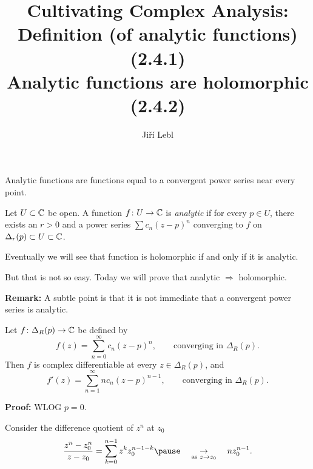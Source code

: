 \documentclass[10pt,aspectratio=169]{beamer}
\author{Ji\v{r}\'i Lebl}
\institute[OSU]{%
Departemento pri Matematiko de Oklahoma {\^S}tata Universitato}
\title{Cultivating Complex Analysis:\\%
Definition (of analytic functions) (2.4.1)\\%
Analytic functions are holomorphic (2.4.2)}
\date{}
\begin{document}
\begin{frame}
\titlepage
\end{frame}


\begin{frame}

Analytic functions are functions equal to
a convergent power series near every point.

\begin{definition}
Let $U \subset {\mathbb{C}}$ be open.  A function $f \colon U \to {\mathbb{C}}$
is \emph{analytic}
if for every $p \in U$, there exists 
an $r > 0$ and a
power series $\sum c_n {(z-p)}^n$ converging to $f$ on $\Delta_r(p) \subset
U \subset {\mathbb{C}}$.
\end{definition}

\pause

Eventually we will see that function is holomorphic if and only if it is
analytic.

\pause
\medskip

But that is not so easy.  Today we will prove that analytic $\Rightarrow$
holomorphic.

\pause
\medskip

\textbf{Remark:}
A subtle point is that it is not immediate that a convergent power series is 
analytic.

\end{frame}

\begin{frame}
\begin{proposition}
Let $f \colon \Delta_R(p) \to {\mathbb{C}}$ be defined by
\begin{equation*}
f(z) = \sum_{n=0}^\infty c_n {(z-p)}^n ,
\qquad \text{converging in } \Delta_R(p) .
\end{equation*}
\pause
Then $f$ is complex differentiable at every $z \in \Delta_R(p)$, and
\begin{equation*}
f'(z) = \sum_{n=1}^\infty n c_n {(z-p)}^{n-1} ,
\qquad \text{converging in } \Delta_R(p) .
\end{equation*}
\end{proposition}

\pause

\textbf{Proof:}
WLOG $p=0$.

\medskip
\pause

Consider the difference quotient of $z^n$ at $z_0$
\[
\frac{z^n-z_0^n}{z-z_0}
=
\sum_{k=0}^{n-1}
z^k z_0^{n-1-k} 
\pause
\quad
\underset{\text{as } z \to z_0}{\to}
\quad n z_0^{n-1} .
\]

\end{frame}
\end{document}
